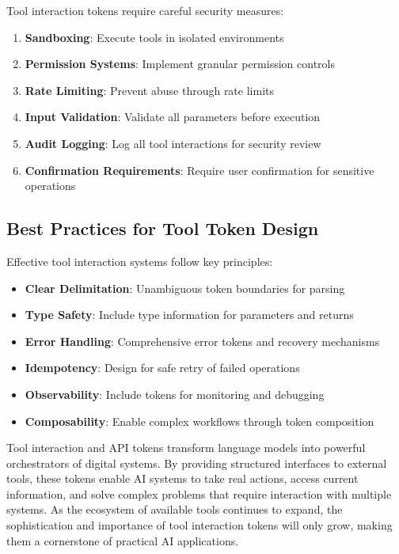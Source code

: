 Tool interaction tokens require careful security measures:

\begin{enumerate}
\item \textbf{Sandboxing}: Execute tools in isolated environments
\item \textbf{Permission Systems}: Implement granular permission controls
\item \textbf{Rate Limiting}: Prevent abuse through rate limits
\item \textbf{Input Validation}: Validate all parameters before execution
\item \textbf{Audit Logging}: Log all tool interactions for security review
\item \textbf{Confirmation Requirements}: Require user confirmation for sensitive operations
\end{enumerate}

\subsection{Best Practices for Tool Token Design}

Effective tool interaction systems follow key principles:

\begin{itemize}
\item \textbf{Clear Delimitation}: Unambiguous token boundaries for parsing
\item \textbf{Type Safety}: Include type information for parameters and returns
\item \textbf{Error Handling}: Comprehensive error tokens and recovery mechanisms
\item \textbf{Idempotency}: Design for safe retry of failed operations
\item \textbf{Observability}: Include tokens for monitoring and debugging
\item \textbf{Composability}: Enable complex workflows through token composition
\end{itemize}

Tool interaction and API tokens transform language models into powerful orchestrators of digital systems. By providing structured interfaces to external tools, these tokens enable AI systems to take real actions, access current information, and solve complex problems that require interaction with multiple systems. As the ecosystem of available tools continues to expand, the sophistication and importance of tool interaction tokens will only grow, making them a cornerstone of practical AI applications.